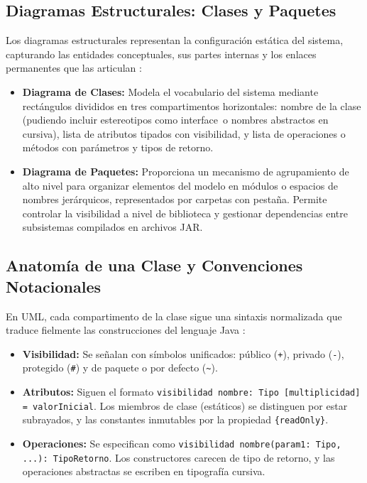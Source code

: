 \documentclass[letterpaper,12pt,oneside]{article}
\numberwithin{figure}{section}
\begin{document}
\subsection{Diagramas Estructurales: Clases y Paquetes}
Los diagramas estructurales representan la configuraci\'on est\'atica del sistema, capturando las entidades conceptuales, sus partes internas y los enlaces permanentes que las articulan \cite{sommerville2011}:
\begin{itemize}
    \item \textbf{Diagrama de Clases:} Modela el vocabulario del sistema mediante rect\'angulos divididos en tres compartimentos horizontales: nombre de la clase (pudiendo incluir estereotipos como \guillemotleft interface\guillemotright\ o nombres abstractos en cursiva), lista de atributos tipados con visibilidad, y lista de operaciones o m\'etodos con par\'ametros y tipos de retorno.
    \item \textbf{Diagrama de Paquetes:} Proporciona un mecanismo de agrupamiento de alto nivel para organizar elementos del modelo en m\'odulos o espacios de nombres jer\'arquicos, representados por carpetas con pesta\~na. Permite controlar la visibilidad a nivel de biblioteca y gestionar dependencias entre subsistemas compilados en archivos JAR.
\end{itemize}

\subsection{Anatom\'ia de una Clase y Convenciones Notacionales}
En UML, cada compartimento de la clase sigue una sintaxis normalizada que traduce fielmente las construcciones del lenguaje Java \cite{deitel2017}:
\begin{itemize}
    \item \textbf{Visibilidad:} Se se\~nalan con s\'imbolos unificados: p\'ublico (\texttt{+}), privado (\texttt{-}), protegido (\texttt{\#}) y de paquete o por defecto (\texttt{\~{}}).
    \item \textbf{Atributos:} Siguen el formato \texttt{visibilidad nombre: Tipo [multiplicidad] = valorInicial}. Los miembros de clase (est\'aticos) se distinguen por estar subrayados, y las constantes inmutables por la propiedad \texttt{\{readOnly\}}.
    \item \textbf{Operaciones:} Se especifican como \texttt{visibilidad nombre(param1: Tipo, ...): TipoRetorno}. Los constructores carecen de tipo de retorno, y las operaciones abstractas se escriben en tipograf\'ia cursiva.
\end{itemize}
\end{document}
